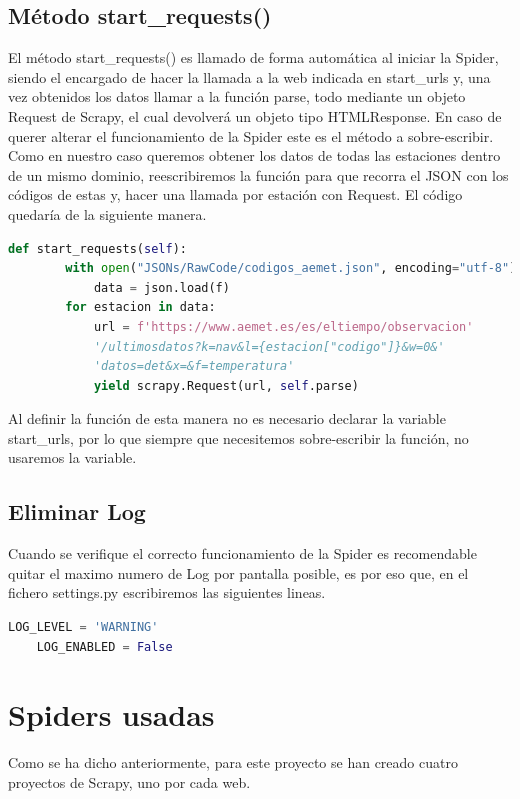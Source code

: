 \subsection{Método start\_requests()}
El método start\_requests() es llamado de forma automática al iniciar la Spider, siendo el encargado de hacer la llamada a la web indicada en start\_urls y, una vez obtenidos los datos llamar a la función parse, todo mediante un objeto Request de Scrapy, el cual devolverá un objeto tipo HTMLResponse. En caso de querer alterar el funcionamiento de la Spider este es el método a sobre-escribir.\newline
\newline
Como en nuestro caso queremos obtener los datos de todas las estaciones dentro de un mismo dominio, reescribiremos la función para que recorra el JSON con los códigos de estas y, hacer una llamada por estación con Request.\newline
\newline
El código quedaría de la siguiente manera.

\begin{lstlisting}[language=Python, caption={Sobre-escritura de start\_request()}]
	def start_requests(self):
		with open("JSONs/RawCode/codigos_aemet.json", encoding="utf-8") as f:
			data = json.load(f)
		for estacion in data:
			url = f'https://www.aemet.es/es/eltiempo/observacion'
			'/ultimosdatos?k=nav&l={estacion["codigo"]}&w=0&'
			'datos=det&x=&f=temperatura'
			yield scrapy.Request(url, self.parse)
\end{lstlisting}

Al definir la función de esta manera no es necesario declarar la variable start\_urls, por lo que siempre que necesitemos sobre-escribir la función, no usaremos la variable.

\subsection{Eliminar Log}
Cuando se verifique el correcto funcionamiento de la Spider es recomendable quitar el maximo numero de Log por pantalla posible, es por eso que, en el fichero settings.py escribiremos las siguientes lineas.

\begin{lstlisting}[language=Python, caption={Configurar LOG}]
	LOG_LEVEL = 'WARNING'
	LOG_ENABLED = False
\end{lstlisting}

\section{Spiders usadas}
Como se ha dicho anteriormente, para este proyecto se han creado cuatro proyectos de Scrapy, uno por cada web.


